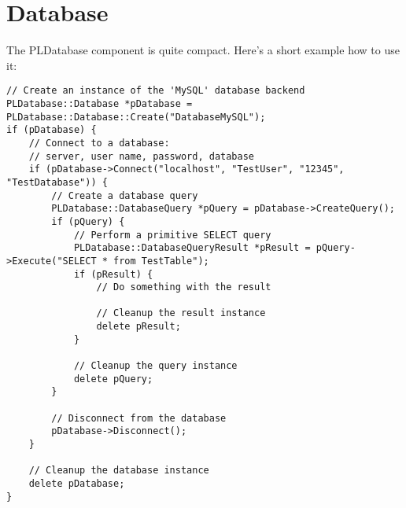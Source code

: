 \section{Database}
The PLDatabase component is quite compact. Here's a short example how to use it:

\begin{lstlisting}[caption=Using the PLDatabase component]
// Create an instance of the 'MySQL' database backend
PLDatabase::Database *pDatabase = PLDatabase::Database::Create("DatabaseMySQL");
if (pDatabase) {
	// Connect to a database:
	// server, user name, password, database
	if (pDatabase->Connect("localhost", "TestUser", "12345", "TestDatabase")) {
		// Create a database query
		PLDatabase::DatabaseQuery *pQuery = pDatabase->CreateQuery();
		if (pQuery) {
			// Perform a primitive SELECT query
			PLDatabase::DatabaseQueryResult *pResult = pQuery->Execute("SELECT * from TestTable");
			if (pResult) {
				// Do something with the result

				// Cleanup the result instance
				delete pResult;
			}

			// Cleanup the query instance
			delete pQuery;
		}

		// Disconnect from the database
		pDatabase->Disconnect();
	}

	// Cleanup the database instance
	delete pDatabase;
}
\end{lstlisting}
